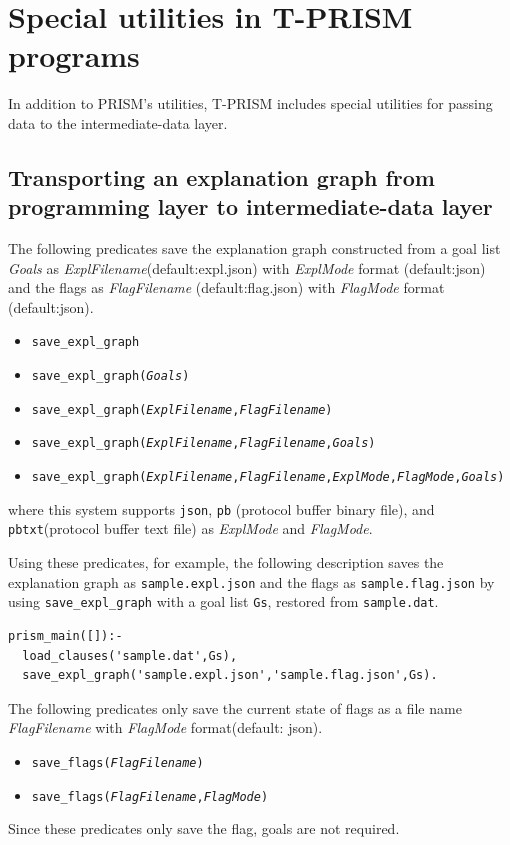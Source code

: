 \documentclass[a4paper]{report}
\begin{document}
\section{Special utilities in T-PRISM programs}
\label{sec:tprism_predicate}

In addition to PRISM's utilities, T-PRISM includes special utilities for passing data to the intermediate-data layer.

\subsection*{Transporting an explanation graph from programming layer to intermediate-data layer}

The following predicates save the explanation graph constructed from a goal list {\it Goals}
as {\it ExplFilename}(default:expl.json) with {\it ExplMode} format (default:json) and the flags as {\it FlagFilename} (default:flag.json) with {\it FlagMode} format (default:json).
\begin{itemize}
	\item {\tt save\_expl\_graph}
	\item {\tt save\_expl\_graph({\it Goals})}
	\item {\tt save\_expl\_graph({\it ExplFilename},{\it FlagFilename})}
	\item {\tt save\_expl\_graph({\it ExplFilename},{\it FlagFilename},{\it Goals})}
	\item {\tt save\_expl\_graph({\it ExplFilename},{\it FlagFilename},{\it ExplMode},{\it FlagMode},{\it Goals})}
\end{itemize}
where this system supports {\tt json}, {\tt pb} (protocol buffer binary file), and {\tt pbtxt}(protocol buffer text file) as {\it ExplMode} and {\it FlagMode}.

Using these predicates, for example, the following description saves the explanation graph as {\tt sample.expl.json} and the flags as {\tt sample.flag.json}
by using {\tt save\_expl\_graph} with a goal list {\tt Gs}, restored from  {\tt sample.dat}.
\begin{verbatim}
prism_main([]):-
  load_clauses('sample.dat',Gs),
  save_expl_graph('sample.expl.json','sample.flag.json',Gs).
\end{verbatim}


The following predicates only save the current state of flags as a file name {\it FlagFilename} with {\it FlagMode} format(default: json).
\begin{itemize}
	\item {\tt save\_flags({\it FlagFilename})}
	\item {\tt save\_flags({\it FlagFilename},{\it FlagMode})}
\end{itemize}
Since these predicates only save the flag, goals are not required.
\end{document}
